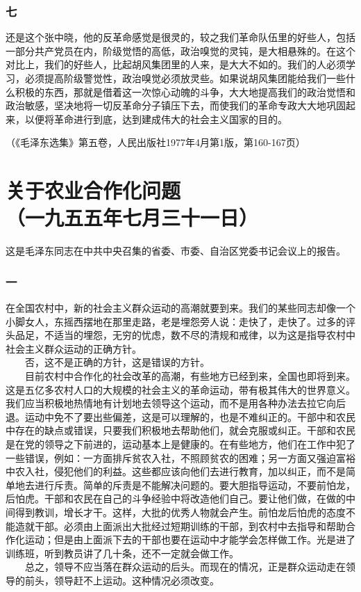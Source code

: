 \documentclass[cn,11pt,chinese]{elegantbook}
\def\myformat#1{\hfil\hfil #1}
\begin{document}
\subsubsection*{\myformat{七}}
还是这个张中晓，他的反革命感觉是很灵的，较之我们革命队伍里的好些人，包括一部分共产党员在内，阶级觉悟的高低，政治嗅觉的灵钝，是大相悬殊的。在这个对比上，我们的好些人，比起胡风集团里的人来，是大大不如的。我们的人必须学习，必须提高阶级警觉性，政治嗅觉必须放灵些。如果说胡风集团能给我们一些什么积极的东西，那就是借着这一次惊心动魄的斗争，大大地提高我们的政治觉悟和政治敏感，坚决地将一切反革命分子镇压下去，而使我们的革命专政大大地巩固起来，以便将革命进行到底，达到建成伟大的社会主义国家的目的。\\
\begin{flushright}（《毛泽东选集》第五卷，人民出版社1977年4月第1版，第160-167页）\end{flushright}
\newpage\section*{\myformat{关于农业合作化问题}\\\myformat{（一九五五年七月三十一日）}}
\begin{introduction}\item  这是毛泽东同志在中共中央召集的省委、市委、自治区党委书记会议上的报告。\end{introduction}
\subsubsection*{\myformat{一}}
在全国农村中，新的社会主义群众运动的高潮就要到来。我们的某些同志却像一个小脚女人，东摇西摆地在那里走路，老是埋怨旁人说：走快了，走快了。过多的评头品足，不适当的埋怨，无穷的忧虑，数不尽的清规和戒律，以为这是指导农村中社会主义群众运动的正确方针。\\
　　否，这不是正确的方针，这是错误的方针。\\
　　目前农村中合作化的社会改革的高潮，有些地方已经到来，全国也即将到来。这是五亿多农村人口的大规模的社会主义的革命运动，带有极其伟大的世界意义。我们应当积极地热情地有计划地去领导这个运动，而不是用各种办法去拉它向后退。运动中免不了要出些偏差，这是可以理解的，也是不难纠正的。干部中和农民中存在的缺点或错误，只要我们积极地去帮助他们，就会克服或纠正。干部和农民是在党的领导之下前进的，运动基本上是健康的。在有些地方，他们在工作中犯了一些错误，例如：一方面排斥贫农入社，不照顾贫农的困难；另一方面又强迫富裕中农入社，侵犯他们的利益。这些都应该向他们去进行教育，加以纠正，而不是简单地去进行斥责。简单的斥责是不能解决问题的。要大胆指导运动，不要前怕龙，后怕虎。干部和农民在自己的斗争经验中将改造他们自己。要让他们做，在做的中间得到教训，增长才干。这样，大批的优秀人物就会产生。前怕龙后怕虎的态度不能造就干部。必须由上面派出大批经过短期训练的干部，到农村中去指导和帮助合作化运动；但是由上面派下去的干部也要在运动中才能学会怎样做工作。光是进了训练班，听到教员讲了几十条，还不一定就会做工作。\\
　　总之，领导不应当落在群众运动的后头。而现在的情况，正是群众运动走在领导的前头，领导赶不上运动。这种情况必须改变。\\
\end{document}
